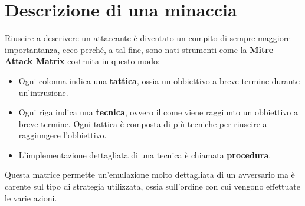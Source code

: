 \chapter{Descrizione di una minaccia}
Riuscire a descrivere un attaccante è diventato un compito di sempre maggiore importantanza, ecco perché, a tal fine,
sono nati strumenti come la \textbf{Mitre Attack Matrix} costruita in questo modo:
\begin{itemize}
	\item Ogni colonna indica una \textbf{tattica}, ossia un obbiettivo a breve termine durante un'intrusione.
	\item Ogni riga indica una \textbf{tecnica}, ovvero il come viene raggiunto un obbiettivo a breve termine. Ogni
	      tattica è composta di più tecniche per riuscire a raggiungere l'obbiettivo.
	\item L'implementazione dettagliata di una tecnica è chiamata \textbf{procedura}.
\end{itemize}
Questa matrice permette un'emulazione molto dettagliata di un avversario ma è carente sul tipo di strategia utilizzata,
ossia sull'ordine con cui vengono effettuate le varie azioni.